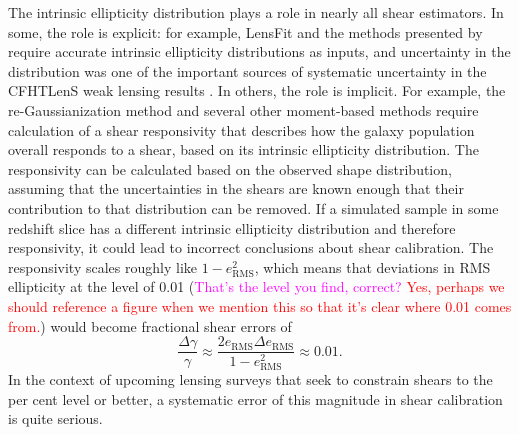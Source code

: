 \documentclass[twocolumn,useAMS,usenatbib]{mn2e}
\newcommand{\rachel}[1]{{\textcolor{red}{#1}}}
\newcommand{\claire}[1]{{\textcolor{magenta}{#1}}}
\begin{document}
The intrinsic ellipticity distribution plays a role in nearly all
shear estimators.  In some, the role is explicit: for example, LensFit
\citep{2007MNRAS.382..315M,2008MNRAS.390..149K,2013MNRAS.429.2858M}
and the methods presented by \cite{2014MNRAS.438.1880B} require
accurate intrinsic ellipticity distributions as inputs, and
uncertainty in the distribution was one of the important sources of
systematic uncertainty in the CFHTLenS weak lensing results
\citep{2013MNRAS.432.2433H,2013MNRAS.429.2858M}.  In others, the role
is implicit.  For example, the re-Gaussianization method and several
other moment-based methods require calculation of a shear responsivity
\citep{BJ02,HS03} that describes how the galaxy population overall
responds to a shear, based on its intrinsic ellipticity distribution.
The responsivity can be calculated based on the observed shape
distribution, assuming that the uncertainties in the shears are known
enough that their contribution to that distribution can be removed.
If a simulated sample in some redshift slice has a different intrinsic
ellipticity distribution and therefore responsivity, it could lead to
incorrect conclusions about shear calibration.  The responsivity
scales roughly like $1-e_\text{RMS}^2$, which means that deviations in
RMS ellipticity at the level of 0.01 (\claire{That's the level you find, correct?} \rachel{Yes, perhaps we should reference a figure when we mention this so that it's clear where 0.01 comes from.}) would become fractional shear
errors of
\begin{equation}
\frac{\Delta\gamma}{\gamma} \approx \frac{2 e_\text{RMS} \Delta
  e_\text{RMS} }{1-e_\text{RMS}^2} \approx 0.01.
\end{equation}
In the context of upcoming lensing surveys that seek to constrain
shears to the per cent level or better, a systematic error of this
magnitude in shear calibration is quite serious.
\end{document}
